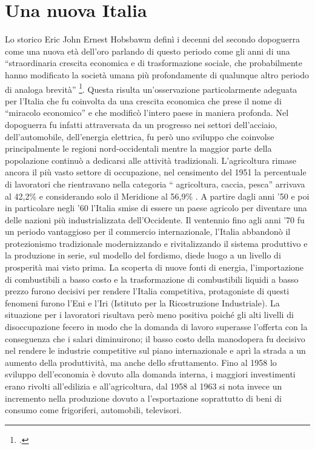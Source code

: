 \section{Una nuova Italia}
Lo storico Eric John Ernest Hobsbawm definì i decenni del secondo dopoguerra come una nuova età dell'oro parlando di questo periodo come gli anni di una \enquote{straordinaria crescita economica e di trasformazione sociale, che probabilmente hanno modificato la società umana più profondamente di qualunque altro periodo di analoga brevità} \footcite{Hobsbawm}.
Questa risulta un'osservazione particolarmente adeguata per l'Italia che fu coinvolta da una crescita economica che prese il nome di \enquote{miracolo economico} e che modificò l'intero paese in maniera profonda.
Nel dopoguerra fu infatti attraversata da un progresso nei settori dell'acciaio, dell'automobile, dell'energia elettrica, fu però uno sviluppo che coinvolse principalmente le regioni nord-occidentali mentre la maggior parte della popolazione continuò a dedicarsi alle attività tradizionali.
L'agricoltura rimase ancora il più vasto settore di occupazione, nel censimento del 1951 la percentuale di lavoratori che rientravano nella categoria \enquote{ agricoltura, caccia, pesca} arrivava al  42,2\% e considerando solo il Meridione al 56,9\% .
A partire dagli anni '50 e poi in particolare negli '60 l'Italia smise di essere un paese agricolo per diventare una delle nazioni più industrializzata dell'Occidente.
Il ventennio fino agli anni '70 fu un periodo vantaggioso per il commercio internazionale, l'Italia abbandonò il protezionismo tradizionale modernizzando e rivitalizzando il sistema produttivo e la produzione in serie, sul modello del fordismo, diede luogo a un livello di prosperità mai visto prima. 
La scoperta di nuove fonti di energia, l'importazione di combustibili a basso costo e la trasformazione di combustibili liquidi a basso prezzo furono decisivi per rendere l'Italia competitiva, protagoniste di questi fenomeni furono l'Eni e l'Iri (Istituto per la Ricostruzione Industriale).
La situazione per i lavoratori risultava però meno positiva poiché gli alti livelli di disoccupazione fecero in modo che la domanda di lavoro superasse l'offerta con la conseguenza che i salari diminuirono; il basso costo della manodopera fu decisivo nel rendere le industrie competitive sul piano internazionale e aprì la strada a un aumento della produttività, ma anche dello sfruttamento. 
Fino al 1958 lo sviluppo dell'economia è dovuto alla domanda interna, i maggiori investimenti erano rivolti all'edilizia e all'agricoltura, dal 1958 al 1963 si nota invece un incremento nella produzione dovuto a l'esportazione soprattutto di beni di consumo come frigoriferi, automobili, televisori.
